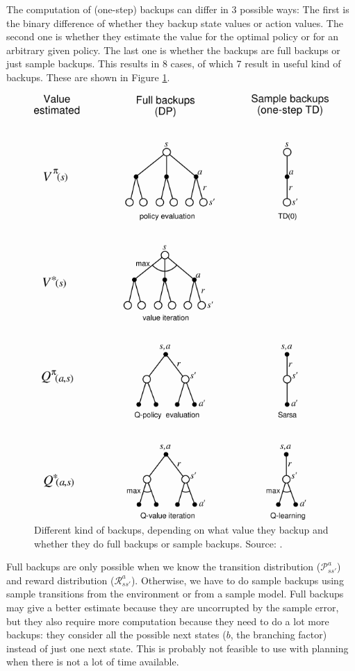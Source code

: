 \documentclass[a4paper]{article}
\begin{document}
The computation of (one-step) backups can differ in 3 possible ways: The first is the binary difference of whether they backup state values or action values. The second one is whether they estimate the value for the optimal policy or for an arbitrary given policy. The last one is whether the backups are full backups or just sample backups. This results in 8 cases, of which 7 result in useful kind of backups. These are shown in Figure \ref{fig:backuptypes}.
\begin{figure}[H]
\includegraphics[width=\linewidth]{images/backuptypes.png}
\caption{Different kind of backups, depending on what value they backup and whether they do full backups or sample backups. Source: \cite{Sutton1998ReinforcementIntroductionb}.}
\label{fig:backuptypes}
\end{figure}
Full backups are only possible when we know the transition distribution ($\mathcal{P}^a_{ss'}$) and reward distribution ($\mathcal{R}^a_{ss'}$). Otherwise, we have to do sample backups using sample transitions from the environment or from a sample model. Full backups may give a better estimate because they are uncorrupted by the sample error, but they also require more computation because they need to do a lot more backups: they consider all the possible next states ($b$, the branching factor) instead of just one next state. This is probably not feasible to use with planning when there is not a lot of time available.\\
\end{document}

